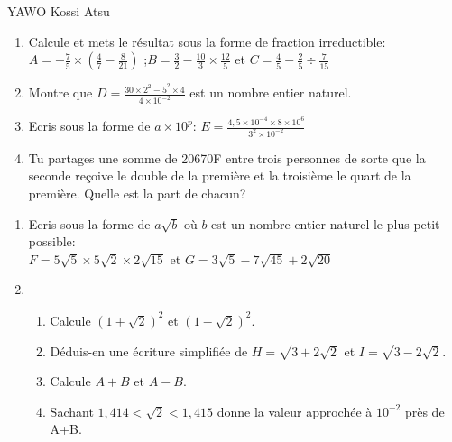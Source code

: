 \documentclass[12pt,a4paper]{book}
\newcommand{\prof}{YAWO Kossi Atsu}
\begin{document}
\begin{revision}{\prof}

\begin{exo}
\begin{enumerate}
\item Calcule et mets le résultat sous la forme de fraction irreductible:\\
$A=-\frac{7}{5}\times \left(\frac{4}{7}-\frac{8}{21}\right)$ \qquad ;\qquad $B=\frac{3}{2}-\frac{10}{3} \times \frac{12}{5}$  \qquad et \qquad $C=\frac{4}{5}-\frac{2}{5}\div \frac{7}{15}$
\item Montre que $D=\frac{30 \times 2^2-5^2\times4}{4\times10^{-2}}$ est un nombre entier naturel.
\item Ecris sous la forme de $a\times 10^p$: $E=\frac{4,5\times10^{-4}\times8\times10^6}{3^2\times10^{-2}}$
\item Tu partages une somme de 20670F entre trois personnes de sorte que la seconde reçoive le double de la première et la troisième le quart de la première. Quelle est la part de chacun?
\end{enumerate}
\end{exo}

\begin{exo}
\begin{enumerate}
\item Ecris sous la forme de $a\sqrt{b}$ où $b$ est un nombre entier naturel le plus petit possible:\\
$F=5\sqrt{5} \times 5\sqrt{2} \times 2\sqrt{15}$ \qquad et \qquad $G=3\sqrt{5}-7\sqrt{45}+2\sqrt{20}$
\item \begin{enumerate}
\item Calcule $(1+\sqrt{2})^2$ et $(1-\sqrt{2})^2$.
\item Déduis-en une écriture simplifiée de $H=\sqrt{3+2\sqrt{2}}$ et $I=\sqrt{3-2\sqrt{2}}$.
\item Calcule $A+B$ et $A-B$.
\item Sachant $1,414<\sqrt{2}<1,415$ donne la valeur approchée à $10^{-2}$ près de A+B.
\end{enumerate}
\end{enumerate}
\end{exo}


\end{revision}
\end{document}
